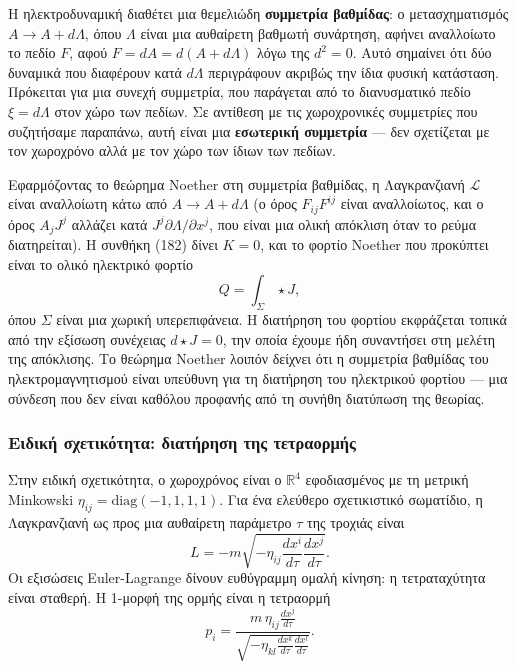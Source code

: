 \documentclass[12pt]{article}
\begin{document}
Η ηλεκτροδυναμική διαθέτει μια θεμελιώδη \textbf{συμμετρία βαθμίδας}: ο μετασχηματισμός $A \to A + d\Lambda$, όπου $\Lambda$ είναι μια αυθαίρετη βαθμωτή συνάρτηση, αφήνει αναλλοίωτο το πεδίο $F$, αφού $F = dA = d(A + d\Lambda)$ λόγω της $d^2 = 0$. Αυτό σημαίνει ότι δύο δυναμικά που διαφέρουν κατά $d\Lambda$ περιγράφουν ακριβώς την ίδια φυσική κατάσταση. Πρόκειται για μια συνεχή συμμετρία, που παράγεται από το διανυσματικό πεδίο $\xi = d\Lambda$ στον χώρο των πεδίων. Σε αντίθεση με τις χωροχρονικές συμμετρίες που συζητήσαμε παραπάνω, αυτή είναι μια \textbf{εσωτερική συμμετρία} — δεν σχετίζεται με τον χωροχρόνο αλλά με τον χώρο των ίδιων των πεδίων.

Εφαρμόζοντας το θεώρημα Noether στη συμμετρία βαθμίδας, η Λαγκρανζιανή $\mathcal{L}$ είναι αναλλοίωτη κάτω από $A \to A + d\Lambda$ (ο όρος $F_{ij}F^{ij}$ είναι αναλλοίωτος, και ο όρος $A_j J^j$ αλλάζει κατά $J^j \partial \Lambda / \partial x^j$, που είναι μια ολική απόκλιση όταν το ρεύμα διατηρείται). Η συνθήκη (182) δίνει $K = 0$, και το φορτίο Noether που προκύπτει είναι το ολικό ηλεκτρικό φορτίο
\[
Q = \int_\Sigma \star J,
\]
όπου $\Sigma$ είναι μια χωρική υπερεπιφάνεια. Η διατήρηση του φορτίου εκφράζεται τοπικά από την εξίσωση συνέχειας $d \star J = 0$, την οποία έχουμε ήδη συναντήσει στη μελέτη της απόκλισης. Το θεώρημα Noether λοιπόν δείχνει ότι η συμμετρία βαθμίδας του ηλεκτρομαγνητισμού είναι υπεύθυνη για τη διατήρηση του ηλεκτρικού φορτίου — μια σύνδεση που δεν είναι καθόλου προφανής από τη συνήθη διατύπωση της θεωρίας.

\subsubsection{Ειδική σχετικότητα: διατήρηση της τετραορμής}

Στην ειδική σχετικότητα, ο χωροχρόνος είναι ο $\mathbb{R}^4$ εφοδιασμένος με τη μετρική Minkowski $\eta_{ij} = \text{diag}(-1, 1, 1, 1)$. Για ένα ελεύθερο σχετικιστικό σωματίδιο, η Λαγκρανζιανή ως προς μια αυθαίρετη παράμετρο $\tau$ της τροχιάς είναι
\[
L = -m \sqrt{-\eta_{ij} \frac{dx^i}{d\tau} \frac{dx^j}{d\tau}}.
\]
Οι εξισώσεις Euler-Lagrange δίνουν ευθύγραμμη ομαλή κίνηση: η τετραταχύτητα είναι σταθερή. Η 1-μορφή της ορμής είναι η τετραορμή
\[
p_i = \frac{m \, \eta_{ij} \frac{dx^j}{d\tau}}{\sqrt{-\eta_{kl} \frac{dx^k}{d\tau} \frac{dx^l}{d\tau}}}.
\]
\end{document}

